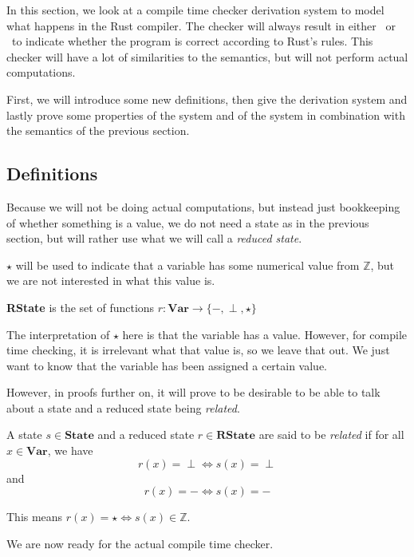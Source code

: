 In this section, we look at a compile time checker derivation system to model what happens in the Rust compiler. The checker will always result in either \tr ~or \fa ~to indicate whether the program is correct according to Rust's rules. This checker will have a lot of similarities to the semantics, but will not perform actual computations. 

First, we will introduce some new definitions, then give the derivation system and lastly prove some properties of the system and of the system in combination with the semantics of the previous section. 

\subsection{Definitions}

Because we will not be doing actual computations, but instead just bookkeeping of whether something is a value, we do not need a state as in the previous section, but will rather use what we will call a \emph{reduced state}. 

\begin{infdefinition}
$\star$ will be used to indicate that a variable has some numerical value from $\mathbb{Z}$, but we are not interested in what this value is.
\end{infdefinition}

\begin{definition}
\textbf{RState} is the set of functions $r: \textbf{Var} \to \{-, \perp, \star \}$
\end{definition}

The interpretation of $\star$ here is that the variable has a value. However, for compile time checking, it is irrelevant what that value is, so we leave that out. We just want to know that the variable has been assigned a certain value.

However, in proofs further on, it will prove to be desirable to be able to talk about a state and a reduced state being \emph{related}.

\begin{definition}
A state $s\in\textbf{State}$ and a reduced state $r\in\textbf{RState}$ are said to be \emph{related} if for all $x\in\textbf{Var}$, we have 
$$r(x) = \perp \iff s(x) = \perp$$
and
$$r(x) = - \iff s(x) = -$$
\end{definition}

This means $r(x) = \star \iff s(x)\in \mathbb{Z}$. 

We are now ready for the actual compile time checker.

